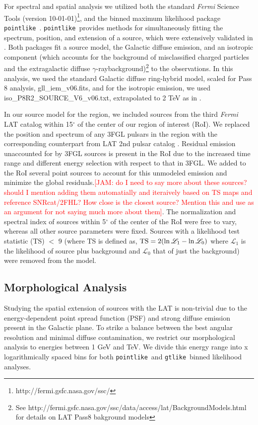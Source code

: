 \documentclass[preprint2]{aastex}
\newcommand{\kibitz}[2]{\ifnum\Comments=1\textcolor{#1}{#2}\fi}
\newcommand{\jamie}[1]{\kibitz{red}      {[JAM: #1]}}
\newcommand{\gam}{$\gamma$-ray}
\newcommand{\Fermi}{\emph{Fermi }}  %
\newcommand{\FermiLat}{\emph{Fermi} LAT }     %
\newcommand{\ptlike}{{\tt pointlike}}
\newcommand{\gtlike}{{\tt gtlike}}
\begin{document}
For spectral and spatial analysis we utilized both the standard \Fermi Science Tools (version 10-01-01)\footnote[1]{http://fermi.gsfc.nasa.gov/ssc/}, and the binned maximum likelihood package \ptlike~\citep{Kerr10}. \ptlike~provides methods for simultaneously fitting the spectrum, position, and extension of a source, which were extensively validated in \cite{Lande12}. Both packages fit a source model, the Galactic diffuse emission, and an isotropic component (which accounts for the background of misclassified charged particles and the extragalactic diffuse \gam background)\footnote[2]{See http://fermi.gsfc.nasa.gov/ssc/data/access/lat/BackgroundModels.html for details on LAT Pass8 bakground models} to the observations.  In this analysis, we used the standard Galactic diffuse ring-hybrid model, scaled  for Pass 8 analysis, gll{\_}iem{\_}v06.fits, and for the isotropic emission,  we used iso{\_}P8R2{\_}SOURCE{\_}V6{\_}v06.txt, extrapolated to 2 TeV as in \cite{2FHL}.

In our source model for the region, we included sources from the third \FermiLat catalog \citep[3FGL]{3FGL} within 15$^\circ$ of the center of our region of interest (RoI). We replaced the position and spectrum of any 3FGL pulsars in the region with the corresponding counterpart  from LAT 2nd pulsar catalog \citep{2PC}.  Residual emission unaccounted for by 3FGL sources is present in the RoI due to the increased time range and different energy selection with respect to that in 3FGL. We added to the RoI several point sources to account for this unmodeled emission and minimize the global residuals.\jamie{do I need to say more about these sources? should I mention adding them automatially and iteraively based on TS maps and reference SNRcat/2FHL? How close is the closest source? Mention this and use as an argument for not saying much more about them}.  The normalization and spectral index of sources within 5$^{\circ}$ of the center of the RoI were free to vary, whereas all other source parameters were fixed. Sources with a likelihood test statistic (TS) $<$ 9 (where TS is defined as, ${\rm TS}=2(\ln \mathcal{L}_1 - \ln \mathcal{L}_0)$ where $\mathcal{L}_1$ is the likelihood of source plus background and  $\mathcal{L}_0$ that of just the background) were removed from the model. 

\subsection{\label{sec:LATmorph}Morphological Analysis}
Studying the spatial extension of sources with the LAT is non-trivial due to the energy-dependent point spread function (PSF) and strong diffuse emission present in the Galactic plane. To strike a balance between the best angular resolution and minimal diffuse contamination, we restrict our morphological analysis to energies between 1 GeV and  TeV. We divide this energy range into x logarithmically spaced bins for both \ptlike~and \gtlike~binned likelihood analyses.
\end{document}

